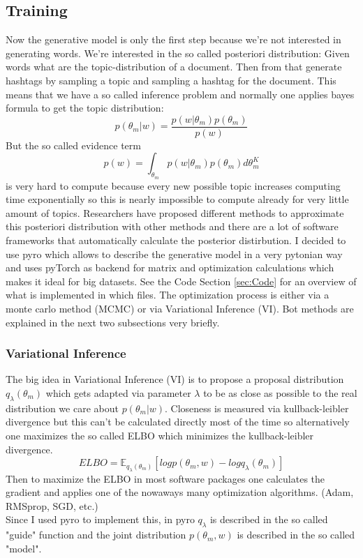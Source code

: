 \documentclass[10pt,conference,compsocconf]{IEEEtran}
\begin{document}
\subsection{Training}
Now the generative model is only the first step because we're not interested in generating words. We're interested in the so called posteriori distribution: Given words what are the topic-distribution of a document. Then from that generate hashtags by sampling a topic and sampling a hashtag for the document. This means that we have a so called inference problem and normally one applies bayes formula to get the topic distribution: \[ p(\theta_m | w) = \frac{p(w | \theta_m)p(\theta_m)}{p(w)} \] But the so called evidence term \[p(w) = \int_{\theta_m} p(w | \theta_m)p(\theta_m) d\theta_m^K \] is very hard to compute because every new possible topic increases computing time exponentially so this is nearly impossible to compute already for very little amount of topics. 
Researchers have proposed different methods to approximate this posteriori distribution with other methods and there are a lot of software frameworks that automatically calculate the posterior distirbution. I decided to use pyro \cite{bingham2018pyro} which allows to describe the generative model in a very pytonian way and uses pyTorch \cite{paszke2017automatic} as backend for matrix and optimization calculations which makes it ideal for big datasets. See the Code Section \ref{sec:Code} for an overview of what is implemented in which files.   The optimization process is either via a monte carlo method (MCMC) or via Variational Inference (VI). Bot methods are explained in the next two subsections very briefly. 

\subsubsection{Variational Inference}
The big idea in Variational Inference (VI) is to propose a proposal distribution $q_\lambda(\theta_m)$ which gets adapted via parameter $\lambda$ to be as close as possible to the real distribution we care about $p(\theta_m | w)$. Closeness is measured via kullback-leibler divergence but this can't be calculated directly most of the time so alternatively one maximizes the so called ELBO which minimizes the kullback-leibler divergence. 
\[ ELBO = \mathbb{E}_{q_\lambda(\theta_m)} [log p(\theta_m, w) - log q_{\lambda}(\theta_m)] \]
Then to maximize the ELBO in most software packages one calculates the gradient and applies one of the nowaways many optimization algorithms. (Adam, RMSprop, SGD, etc.)\\
Since I used pyro to implement this, in pyro $q_\lambda$ is described in the so called "guide" function and the joint distribution $p(\theta_m, w)$ is described in the so called "model". 
\end{document}
